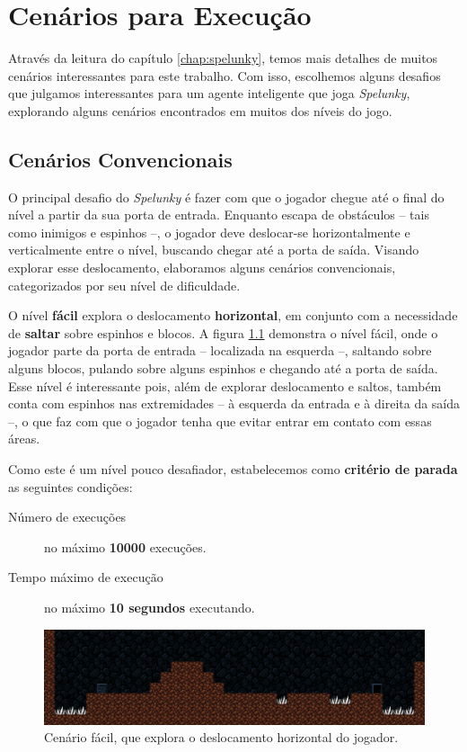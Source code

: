 \chapter{\label{chap:scenarios}Cenários para Execução}

Através da leitura do capítulo \ref{chap:spelunky}, temos mais detalhes de
muitos cenários interessantes para este trabalho. Com isso, escolhemos alguns
desafios que julgamos interessantes para um agente inteligente que joga
\textit{Spelunky}, explorando alguns cenários encontrados em muitos dos níveis
do jogo.

\section{Cenários Convencionais}

O principal desafio do \textit{Spelunky} é fazer com que o jogador chegue até
o final do nível a partir da sua porta de entrada. Enquanto escapa de
obstáculos -- tais como inimigos e espinhos --, o jogador deve deslocar-se
horizontalmente e verticalmente entre o nível, buscando chegar até a porta de
saída. Visando explorar esse deslocamento, elaboramos alguns cenários
convencionais, categorizados por seu nível de dificuldade.

O nível \textbf{fácil} explora o deslocamento \textbf{horizontal}, em conjunto
com a necessidade de \textbf{saltar} sobre espinhos e blocos. A figura
\ref{fig:level1} demonstra o nível fácil, onde o jogador parte da porta de
entrada -- localizada na esquerda --, saltando sobre alguns blocos, pulando
sobre alguns espinhos e chegando até a porta de saída. Esse nível é
interessante pois, além de explorar deslocamento e saltos, também conta com
espinhos nas extremidades -- à esquerda da entrada e à direita da saída --, o
que faz com que o jogador tenha que evitar entrar em contato com essas áreas.

Como este é um nível pouco desafiador, estabelecemos como \textbf{critério de
parada} as seguintes condições:

\begin{description}
    \item [Número de execuções] no máximo \textbf{10000} execuções.
    \item [Tempo máximo de execução] no máximo \textbf{10 segundos} executando.
\end{description}

\begin{figure}[H]
\centering
\includegraphics[width=\textwidth]{fig/levels/level1.pdf}
\caption{Cenário fácil, que explora o deslocamento horizontal do jogador.}
\label{fig:level1}
\end{figure}

